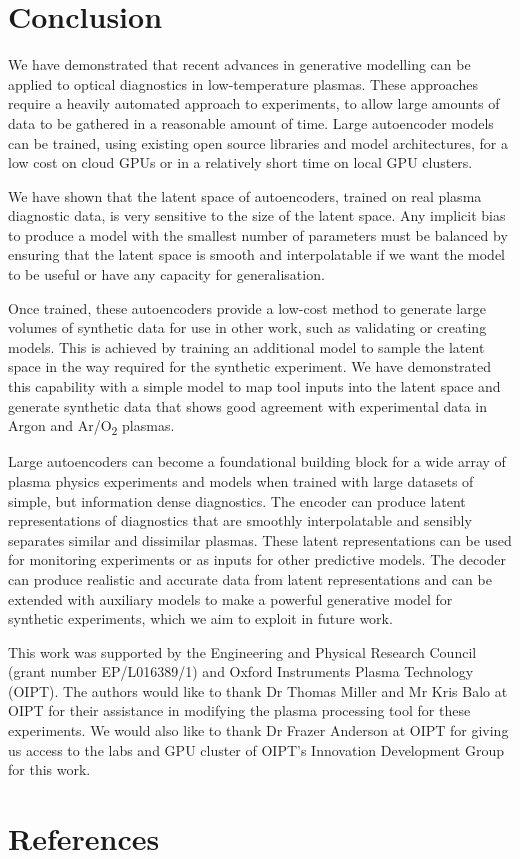 \documentclass[10pt]{iopart}
\begin{document}
\section{Conclusion}
\label{conc}

We have demonstrated that recent advances in generative modelling can be applied to optical diagnostics in low-temperature plasmas. These approaches require a heavily automated approach to experiments, to allow large amounts of data to be gathered in a reasonable amount of time. Large autoencoder models can be trained, using existing open source libraries and model architectures, for a low cost on cloud GPUs or in a relatively short time on local GPU clusters. 

We have shown that the latent space of autoencoders, trained on real plasma diagnostic data, is very sensitive to the size of the latent space. Any implicit bias to produce a model with the smallest number of parameters must be balanced by ensuring that the latent space is smooth and interpolatable if we want the model to be useful or have any capacity for generalisation.

Once trained, these autoencoders provide a low-cost method to generate large volumes of synthetic data for use in other work, such as validating or creating models. This is achieved by training an additional model to sample the latent space in the way required for the synthetic experiment. We have demonstrated this capability with a simple model to map tool inputs into the latent space and generate synthetic data that shows good agreement with experimental data in Argon and Ar/O\textsubscript{2} plasmas.

Large autoencoders can become a foundational building block for a wide array of plasma physics experiments and models when trained with large datasets of simple, but information dense diagnostics. The encoder can produce latent representations of diagnostics that are smoothly interpolatable and sensibly separates similar and dissimilar plasmas. These latent representations can be used for monitoring experiments or as inputs for other predictive models. The decoder can produce realistic and accurate data from latent representations and can be extended with auxiliary models to make a powerful generative model for synthetic experiments, which we aim to exploit in future work.

\ack


This work was supported by the Engineering and Physical Research Council (grant number EP/L016389/1) and Oxford Instruments Plasma Technology (OIPT). The authors would like to thank Dr Thomas Miller and Mr Kris Balo at OIPT for their assistance in modifying the plasma processing tool for these experiments.  We would also like to thank Dr Frazer Anderson at OIPT for giving us access to the labs and GPU cluster of OIPT's Innovation Development Group for this work.

\section*{References}



\end{document}
